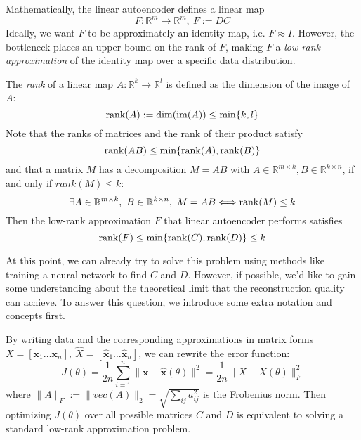 \documentclass[../main.tex]{subfiles}
\begin{document}
\par Mathematically, the linear autoencoder defines a linear map 
\begin{equation*}
F:\mathbb{R}^m \rightarrow \mathbb{R}^m,\ F:=DC
\end{equation*}
Ideally, we want $F$ to be approximately an identity map, i.e. $F\approx I$. However, the bottleneck places an upper bound on the rank of $F$, making $F$ a \emph{low-rank approximation} of the identity map over a specific data distribution.
\par The \emph{rank} of a linear map $A:\mathbb{R}^k\rightarrow \mathbb{R}^l$ is defined as the dimension of the image of $A$:
\begin{equation*}
{\rm rank}(A):={\rm dim}({\rm im}(A))\leq \min\{k,l\}
\end{equation*}
Note that the ranks of matrices and the rank of their product satisfy
\begin{equation*}
{\rm rank}(AB)\leq \min\{{\rm rank}(A), {\rm rank}(B)\}
\end{equation*}
and that a matrix $M$ has a decomposition $M=AB$ with $A\in \mathbb{R}^{m\times k},B\in \mathbb{R}^{k\times n}$, if and only if $rank(M)\leq k$:
\begin{equation*}
\exists A\in \mathbb{R}^{m\times k},\ B\in \mathbb{R}^{k\times n},\ M=AB \Longleftrightarrow {\rm rank}(M)\leq k
\end{equation*}
Then the low-rank approximation $F$ that linear autoencoder performs satisfies
\begin{equation*}
{\rm rank}(F)\leq \min\{{\rm rank}(C),{\rm rank}(D)\}\leq k
\end{equation*}
\par At this point, we can already try to solve this problem using methods like training a neural network to find $C$ and $D$. However, if possible, we'd like to gain some understanding about the theoretical limit that the reconstruction quality can achieve. To answer this question, we introduce some extra notation and concepts first.
\par By writing data and the corresponding approximations in matrix forms $X = [\bm{x}_1\dots \bm{x}_n],\ \hat{X} = [\hat{\bm{x}}_1\dots \hat{\bm{x}}_n]$, we can rewrite the error function:
\begin{equation*}
J(\theta)=\frac{1}{2n}\sum_{i=1}^{n}\|\bm{x}-\hat{\bm{x}}(\theta)\|^2=\frac{1}{2n}\|X-\hat{X}(\theta)\|^2_F
\end{equation*}
where $\|A\|_F:=\|vec(A)\|_2=\sqrt{\sum_{ij}a_{ij}^2}$ is the Frobenius norm. Then optimizing $J(\theta)$ over all possible matrices $C$ and $D$ is equivalent to solving a standard low-rank approximation problem.
\end{document}
